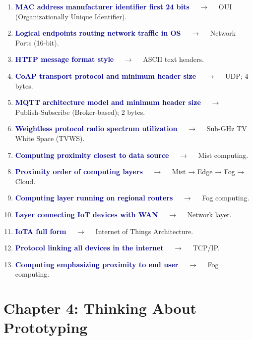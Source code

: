 \documentclass[11pt,a4paper]{article}
\begin{document}
\begin{enumerate}[label=\arabic*., leftmargin=*, labelsep=0.8em, itemsep=0.35em, parsep=0.1em, topsep=0.2em]
  \item \textcolor{darkblue}{\textbf{MAC address manufacturer identifier first 24 bits}} $\quad\to\quad$ OUI (Organizationally Unique Identifier).
  \item \textcolor{darkblue}{\textbf{Logical endpoints routing network traffic in OS}} $\quad\to\quad$ Network Ports (16-bit).
  \item \textcolor{darkblue}{\textbf{HTTP message format style}} $\quad\to\quad$ ASCII text headers.
  \item \textcolor{darkblue}{\textbf{CoAP transport protocol and minimum header size}} $\quad\to\quad$ UDP; 4 bytes.
  \item \textcolor{darkblue}{\textbf{MQTT architecture model and minimum header size}} $\quad\to\quad$ Publish-Subscribe (Broker-based); 2 bytes.
  \item \textcolor{darkblue}{\textbf{Weightless protocol radio spectrum utilization}} $\quad\to\quad$ Sub-GHz TV White Space (TVWS).
  \item \textcolor{darkblue}{\textbf{Computing proximity closest to data source}} $\quad\to\quad$ Mist computing.
  \item \textcolor{darkblue}{\textbf{Proximity order of computing layers}} $\quad\to\quad$ Mist → Edge → Fog → Cloud.
  \item \textcolor{darkblue}{\textbf{Computing layer running on regional routers}} $\quad\to\quad$ Fog computing.
  \item \textcolor{darkblue}{\textbf{Layer connecting IoT devices with WAN}} $\quad\to\quad$ Network layer.
  \item \textcolor{darkblue}{\textbf{IoTA full form}} $\quad\to\quad$ Internet of Things Architecture.
  \item \textcolor{darkblue}{\textbf{Protocol linking all devices in the internet}} $\quad\to\quad$ TCP/IP.
  \item \textcolor{darkblue}{\textbf{Computing emphasizing proximity to end user}} $\quad\to\quad$ Fog computing.
\end{enumerate}

\section*{Chapter 4: Thinking About Prototyping}
\end{document}

